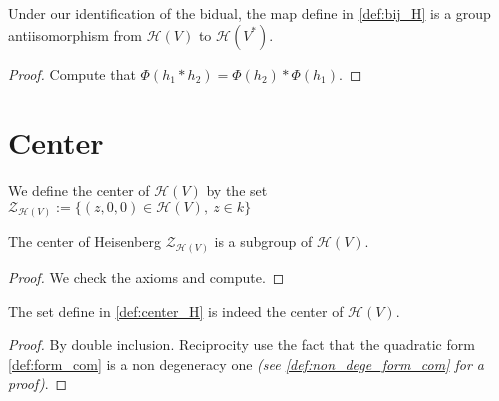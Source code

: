 \begin{definition}
    \label{prop:antiisoH}
    \leanok 

    Under our identification of the bidual, the map define in \ref{def:bij_H} is
    a group antiisomorphism from $\mathcal{H}(V)$ to $\mathcal{H}(V^*)$.
    \begin{proof}
        \leanok
        Compute that $\Phi(h_1*h_2)=\Phi(h_2)*\Phi(h_1)$.
    \end{proof}
\end{definition}

\section{Center}

\begin{definition}
    \label{def:center_H}
    \leanok 

    We define the center of $\mathcal{H}(V)$ by the set
    $\mathcal{Z}_{\mathcal{H}(V)}:=\{(z,0,0)\in\mathcal{H}(V),\ z\in k\}$
\end{definition}

\begin{proposition}
    \label{prop:center_H_subgroup}
    \leanok

    The center of Heisenberg $\mathcal{Z}_{\mathcal{H}(V)}$ is a subgroup
    of $\mathcal{H}(V)$.
\end{proposition}
\begin{proof}
    \leanok
    We check the axioms and compute.
\end{proof}

\begin{proposition}
    \label{prop:center_H_is_center}
    \leanok

    The set define in \ref{def:center_H} is indeed the center of $\mathcal{H}(V)$.
\end{proposition}
\begin{proof}
    \leanok
    By double inclusion. Reciprocity use the fact that the quadratic form \ref{def:form_com}
    is a non degeneracy one \textit{(see \ref{def:non_dege_form_com} for a proof)}.
\end{proof}

